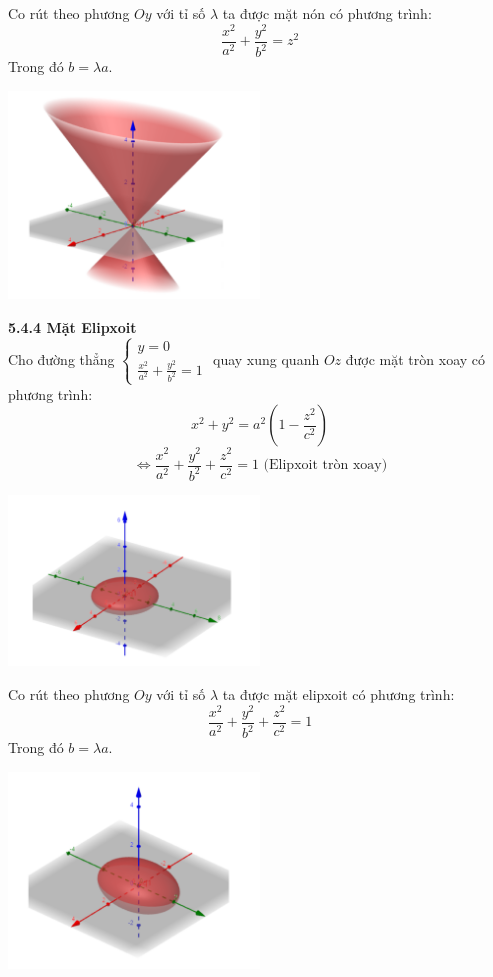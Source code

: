 \documentclass[12pt,a4]{article}
\begin{document}
\begin{titlepage}
\begin{center}
\end{center}
Co rút theo phương $Oy$ với tỉ số $\lambda$ ta được mặt nón có phương trình:
\[
\frac{x^2}{a^2} + \frac{y^2}{b^2} = z^2
\]
Trong đó $b = \lambda a.$\\
\begin{center}
    \includegraphics[width=0.5\textwidth]{image/truvanon4.png}
\end{center}
\vspace{0.2cm}
\textbf{5.4.4 Mặt Elipxoit}\\
\vspace{0.2cm}
Cho đường thẳng $\begin{cases} y = 0\\ \frac{x^2}{a^2} + \frac{y^2}{b^2} = 1\end{cases}$ quay xung quanh $Oz$ được mặt tròn xoay có phương trình:
\[
x^2 + y^2 = a^2 (1 - \frac{z^2}{c^2})
\]
\[
\Leftrightarrow \frac{x^2}{a^2} + \frac{y^2}{b^2} + \frac{z^2}{c^2} = 1 \text{ (Elipxoit tròn xoay)}
\]
\begin{center}
    \includegraphics[width=0.5\textwidth]{image/elip.png}
\end{center}
Co rút theo phương $Oy$ với tỉ số $\lambda$ ta được mặt elipxoit có phương trình:
\[
\frac{x^2}{a^2} + \frac{y^2}{b^2} + \frac{z^2}{c^2} = 1
\]
Trong đó $b = \lambda a.$\\
\begin{center}
    \includegraphics[width=0.5\textwidth]{image/elip2.png}

\end{center}
\end{titlepage}
\end{document}
